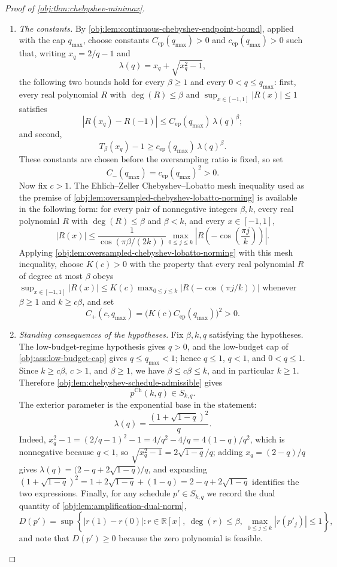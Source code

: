 \documentclass[11pt]{article}
\begin{document}
\begin{proof}[Proof of \cref{obj:thm:chebyshev-minimax}]
\begin{enumerate}
\item \emph{The constants.}
By \cref{obj:lem:continuous-chebyshev-endpoint-bound}, applied with the cap \(q_{\max}\), choose constants
\(C_{\mathrm{ep}}(q_{\max})>0\) and \(c_{\mathrm{ep}}(q_{\max})>0\) such that, writing
\(x_q=2/q-1\) and
\[
\lambda(q)=x_q+\sqrt{x_q^2-1},
\]
the following two bounds hold for every \(\beta\ge1\) and every \(0<q\le q_{\max}\): first, every real polynomial \(R\) with \(\deg(R)\le\beta\) and \(\sup_{x\in[-1,1]}|R(x)|\le1\) satisfies
\[
|R(x_q)-R(-1)|\le C_{\mathrm{ep}}(q_{\max})\,\lambda(q)^\beta ;
\]
and second,
\[
T_\beta(x_q)-1\ge c_{\mathrm{ep}}(q_{\max})\,\lambda(q)^\beta .
\]
These constants are chosen before the oversampling ratio is fixed, so set
\[
C_-(q_{\max})=c_{\mathrm{ep}}(q_{\max})^2>0.
\]
Now fix \(c>1\). The Ehlich--Zeller Chebyshev--Lobatto mesh inequality used as the premise of \cref{obj:lem:oversampled-chebyshev-lobatto-norming} is available in the following form: for every pair of nonnegative integers \(\beta,k\), every real polynomial \(R\) with \(\deg(R)\le\beta\) and \(\beta<k\), and every \(x\in[-1,1]\),
\[
 |R(x)|
 \le
 \frac{1}{\cos(\pi\beta/(2k))}
 \max_{0\le j\le k}\left|R\!\left(-\cos\!\left(\frac{\pi j}{k}\right)\right)\right|.
\]
Applying \cref{obj:lem:oversampled-chebyshev-lobatto-norming} with this mesh inequality, choose
\(K(c)>0\) with the property that every real polynomial \(R\) of degree at most \(\beta\) obeys
\(\sup_{x\in[-1,1]}|R(x)|\le K(c)\max_{0\le j\le k}\left|R(-\cos(\pi j/k))\right|\) whenever \(\beta\ge1\) and \(k\ge c\beta\), and set
\[
C_+(c,q_{\max})=\bigl(K(c)C_{\mathrm{ep}}(q_{\max})\bigr)^2>0 .
\]

\item \emph{Standing consequences of the hypotheses.}
Fix \(\beta,k,q\) satisfying the hypotheses. The low-budget-regime hypothesis gives \(q>0\), and the low-budget cap of \cref{obj:ass:low-budget-cap} gives
\(q\le q_{\max}<1\); hence \(q\le 1\), \(q<1\), and \(0<q\le 1\). Since \(k\ge c\beta\), \(c>1\), and
\(\beta\ge1\), we have \(\beta\le c\beta\le k\), and in particular \(k\ge1\). Therefore
\cref{obj:lem:chebyshev-schedule-admissible} gives
\[
p^{\mathrm{Ch}}(k,q)\in S_{k,q}.
\]
The exterior parameter is the exponential base in the statement:
\[
\lambda(q)=\frac{(1+\sqrt{1-q})^2}{q}.
\]
Indeed, \(x_q^2-1=(2/q-1)^2-1=4/q^2-4/q=4(1-q)/q^2\), which is nonnegative because \(q<1\), so \(\sqrt{x_q^2-1}=2\sqrt{1-q}/q\); adding \(x_q=(2-q)/q\) gives \(\lambda(q)=\bigl(2-q+2\sqrt{1-q}\bigr)/q\), and expanding \((1+\sqrt{1-q})^2=1+2\sqrt{1-q}+(1-q)=2-q+2\sqrt{1-q}\) identifies the two expressions.
Finally, for any schedule \(p'\in S_{k,q}\) we record the dual quantity of \cref{obj:lem:amplification-dual-norm},
\[
D(p')=\sup\left\{|r(1)-r(0)|:
r\in\mathbb R[x],\ \deg(r)\le\beta,\ \max_{0\le j\le k}|r(p'_j)|\le1\right\},
\]
and note that \(D(p')\ge0\) because the zero polynomial is feasible.


\end{enumerate}
\end{proof}
\end{document}
